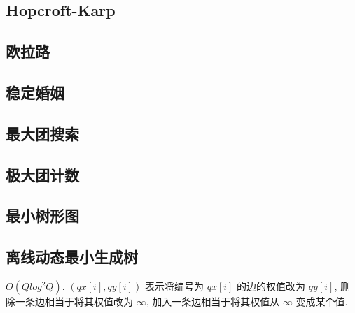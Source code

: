 \documentclass[landscape, twocolumn, 8pt, a4paper, twoside]{extarticle}
\begin{document}
\subsection{Hopcroft-Karp}


\subsection{欧拉路}


\subsection{稳定婚姻}


\subsection{最大团搜索}


\subsection{极大团计数}


\subsection{最小树形图}


\subsection{离线动态最小生成树}
$O (Q log^2 Q) $.
$(qx[i], qy[i])$ 表示将编号为 $qx[i]$ 的边的权值改为 $qy[i]$,
删除一条边相当于将其权值改为 $\infty$,
加入一条边相当于将其权值从 $\infty$ 变成某个值.

\end{document}
